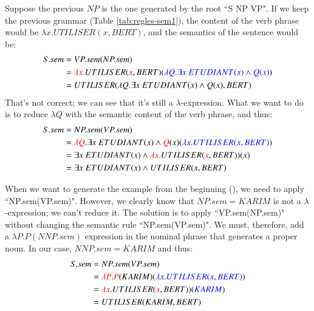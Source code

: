 \documentclass{KBook}
\begin{document}
Suppose the previous $NP$ is the one generated by the root ``S \textrightarrow NP VP". 
If we keep the previous grammar (Table \ref{tab:regles-sem1}), the content of the verb phrase would be $\lambda x.UTILISER(x, BERT)$, and the semantics of the sentence would be:
\begin{align*}
S.sem & = VP.sem(NP.sem) \\
& = \textcolor{red}{\lambda x}.UTILISER(\textcolor{red}{x}, BERT)(\textcolor{blue}{\lambda Q.\exists x\ ETUDIANT(x) \wedge Q(x)})\\
& = UTILISER(\lambda Q.\exists x\ ETUDIANT(x) \wedge Q(x), BERT)
\end{align*}
That's not correct; we can see that it's still a $\lambda $-expression. 
What we want to do is to reduce $\lambda Q$ with the semantic content of the verb phrase, and thus:
\begin{align*}
S.sem & = NP.sem(VP.sem) \\
& = \textcolor{red}{\lambda Q}.\exists x\ ETUDIANT(x) \wedge \textcolor{red}{Q}(x)(\textcolor{blue}{\lambda x.UTILISER(x, BERT)})\\
& = \exists x\ ETUDIANT(x) \wedge \textcolor{red}{\lambda x}.UTILISER(\textcolor{red}{x}, BERT))(x) \\
& = \exists x\ ETUDIANT(x) \wedge UTILISER(x, BERT)
\end{align*}

When we want to generate the example from the beginning (), we need to apply ``NP.sem(VP.sem)". 
However, we clearly know that $NP.sem = KARIM$ is not a $\lambda $-expression; we can't reduce it. 
The solution is to apply ``VP.sem(NP.sem)" without changing the semantic rule ``NP.sem(VP.sem)". 
We must, therefore, add a $\lambda P.P(NNP.sem)$ expression in the nominal phrase that generates a proper noun. 
In our case, $NNP.sem = KARIM$ and thus:
\begin{align*}
S.sem & = NP.sem(VP.sem) \\
& = \textcolor{red}{\lambda P}.\textcolor{red}{P}(KARIM)(\textcolor{blue}{\lambda x.UTILISER(x, BERT)})\\
& = \textcolor{red}{\lambda x}.UTILISER(\textcolor{red}{x}, BERT))(\textcolor{blue}{KARIM}) \\
& = UTILISER(KARIM, BERT)
\end{align*}
\end{document}
